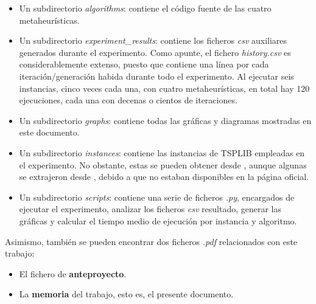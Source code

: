 \begin{itemize}
  \item Un subdirectorio \textit{algorithms}: contiene el código fuente de las cuatro metaheurísticas.
  \item Un subdirectorio \textit{experiment\_results}: contiene los ficheros \textit{csv} auxiliares generados durante el 
  experimento. Como apunte, el fichero \textit{history.csv} es considerablemente extenso, puesto que contiene una línea por 
  cada iteración/generación habida durante todo el experimento. Al ejecutar seis instancias, cinco veces cada una, con cuatro
  metaheurísticas, en total hay 120 ejecuciones, cada una con decenas o cientos de iteraciones.
  \item Un subdirectorio \textit{graphs}: contiene todas las gráficas y diagramas mostradas en este documento.
  \item Un subdirectorio \textit{instances}: contiene las instancias de TSPLIB empleadas en el experimento. No obstante, estas 
  se pueden obtener desde \cite{tsplib}, aunque algunas se extrajeron desde \cite{shredder_github}, debido a que no estaban
  disponibles en la página oficial.
  \item Un subdirectorio \textit{scripts}: contiene una serie de ficheros \textit{.py}, encargados de ejecutar el experimento,
  analizar los ficheros \textit{csv} resultado, generar las gráficas y calcular el tiempo medio de ejecución por instancia y 
  algoritmo.
\end{itemize}

Asimismo, también se pueden encontrar dos ficheros \textit{.pdf} relacionados con este trabajo:
\begin{itemize}
  \item El fichero de \textbf{anteproyecto}.
  \item La \textbf{memoria} del trabajo, esto es, el presente documento.
\end{itemize}



